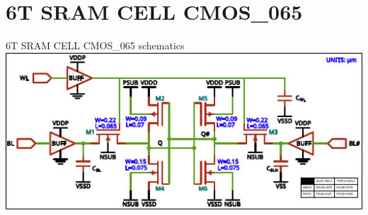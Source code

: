 
\section{6T SRAM CELL CMOS\_065}
\begin{frame}{6T SRAM CELL CMOS\_065 schematics}
	\vspace{7.5mm}
	\centering
	\includegraphics[width=1.0\textwidth]{./figures/sram_simulated.pdf}

\end{frame}
